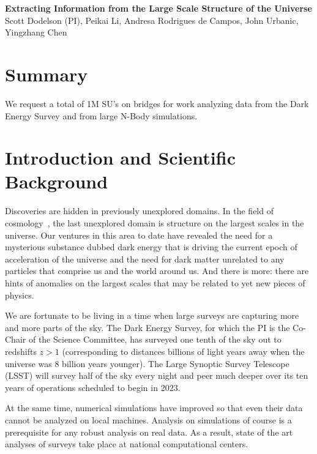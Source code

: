 \documentclass[12pt]{article}
\begin{document}
\topmargin=-2.105cm
\oddsidemargin=-0.1cm
\evensidemargin=0cm

\begin{center}
{\bf Extracting Information from the Large Scale Structure of the Universe\\}
Scott Dodelson (PI), Peikai Li, Andresa Rodrigues de Campos, John Urbanic, Yingzhang Chen
\end{center}

\begin{small}


\section*{Summary} We request a total of 1M SU's on bridges for work analyzing data from the Dark Energy Survey and from large N-Body simulations.

\section{Introduction and Scientific Background}

Discoveries are hidden in previously unexplored domains. In the field of cosmology~\cite{Dodelson:2003ft}, the last unexplored domain is structure on the largest scales in the universe. Our ventures in this area to date have revealed the need for a mysterious substance dubbed dark energy that is driving the current epoch of acceleration of the universe and the need for dark matter unrelated to any particles that comprise us and the world around us. And there is more: there are hints of anomalies on the largest scales that may be related to yet new pieces of physics. 

We are fortunate to be living in a time when large surveys are capturing more and more parts of the sky. The Dark Energy Survey, for which the PI is the Co-Chair of the Science Committee, has surveyed one tenth of the sky out to redshifts $z>1$ (corresponding to distances billions of light years away when the universe was 8 billion years younger). The Large Synoptic Survey Telescope (LSST) will survey half of the sky every night and peer much deeper over its ten years of operations scheduled to begin in 2023. 

At the same time, numerical simulations have improved so that even their data cannot be analyzed on local machines. Analysis on simulations of course is a prerequisite for any robust analysis on real data. As a result, state of the art analyses of surveys take place at national computational centers.


\end{small}
\end{document}
